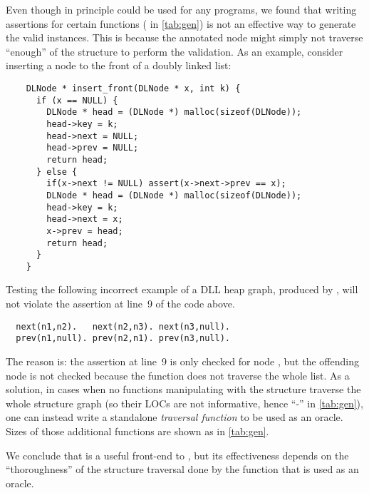%
Even though in principle \ggen could be used for any programs,
%
we found that writing assertions for certain functions
( in \autoref{tab:gen}) is not an effective way to
generate the valid instances. 
%
This is because the annotated node might simply not traverse ``enough''
of the structure to perform the validation.
%
As an example, consider inserting a node to the
front of a doubly linked list:
%
\begin{verbatim}
    DLNode * insert_front(DLNode * x, int k) {
      if (x == NULL) {
        DLNode * head = (DLNode *) malloc(sizeof(DLNode));
        head->key = k;
        head->next = NULL;
        head->prev = NULL;
        return head;
      } else {
        if(x->next != NULL) assert(x->next->prev == x);
        DLNode * head = (DLNode *) malloc(sizeof(DLNode));
        head->key = k;
        head->next = x;
        x->prev = head;
        return head; 
      } 
    }
\end{verbatim}
%
Testing the following incorrect example of a DLL heap graph, produced
by \ggen, will not violate the assertion at line~9 of the code above.
%
\begin{verbatim}
  next(n1,n2).   next(n2,n3). next(n3,null).
  prev(n1,null). prev(n2,n1). prev(n3,null).
\end{verbatim}
%
The reason is: the assertion at line~9 is only checked for node
, but the offending node  is not checked because
the function does not traverse the whole list.
%
As a solution, 
%
in cases when no functions manipulating with the structure traverse
the whole structure graph (so their LOCs are not informative, hence
``-'' in \autoref{tab:gen}), one can instead write a standalone
\emph{traversal function} to be used as an oracle. Sizes of those
additional functions are shown as  in
\autoref{tab:gen}.
%

We conclude that \ggen is a useful front-end to \tool, but its
effectiveness depends on the ``thoroughness'' of the structure
traversal done by the function that is used as an oracle.



